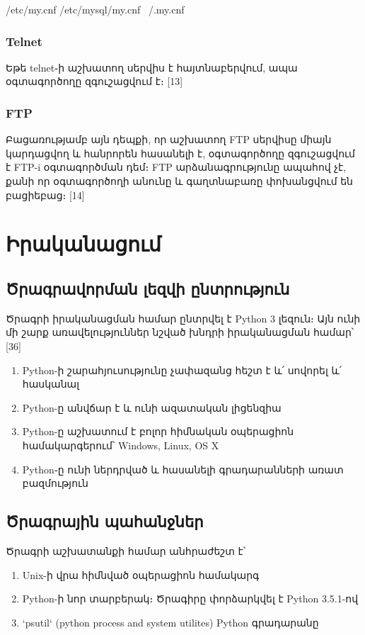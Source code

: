 \documentclass[12pt]{article}
\begin{document}
\begin{sloppypar}
    /etc/my.cnf
    /etc/mysql/my.cnf
    ~/.my.cnf

\subsubsection{Telnet}

Եթե telnet֊ի աշխատող սերվիս է հայտնաբերվում, ապա օգտագործողը զգուշացվում է։
[13]

\subsubsection{FTP}

Բացառությամբ այն դեպքի, որ աշխատող FTP սերվիսը միայն կարդացվող և
հանրորեն հասանելի է, օգտագործողը զգուշացվում է FTP-i օգտագործման դեմ։
FTP արձանագրությունը ապահով չէ, քանի որ օգտագործողի անունը և
գաղտնաբառը փոխանցվում են բացիեբաց։ [14]


\section{Իրականացում}


\subsection{Ծրագրավորման լեզվի ընտրություն}


Ծրագրի իրականացման համար ընտրվել է Python 3 լեզուն։
Այն ունի մի շարք առավելություններ նշված խնդրի իրականացման համար՝
[36]
\begin{enumerate}
\item Python-ի շարահյուսությունը չափազանց հեշտ է և՛ սովորել և՛ հասկանալ
\item Python-ը անվճար է և ունի ազատական լիցենզիա
\item Python-ը աշխատում է բոլոր հիմնական օպերացիոն համակարգերում՝ Windows, Linux, OS X
\item Python֊ը ունի ներդրված և հասանելի գրադարանների առատ բազմություն
\end{enumerate}


\subsection{Ծրագրային պահանջներ}

Ծրագրի աշխատանքի համար անհրաժեշտ է՝

\begin{enumerate}
\item Unix-ի վրա հիմնված օպերացիոն համակարգ
\item Python-ի նոր տարբերակ։ Ծրագիրը փորձարկվել է Python 3.5.1-ով
\item `psutil` (python process and system utilites) Python գրադարանը
\end{enumerate}


\end{sloppypar}
\end{document}

